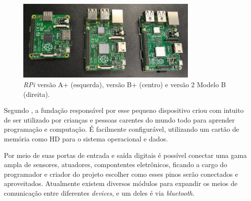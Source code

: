 \begin{figure}[htb]
	\caption{\label{fig:todos-rpi}\textit{RPi} versão A+ (esquerda), versão B+ (centro) e versão 2 Modelo B (direita).}
	\begin{center}
		\includegraphics[width=0.8\textwidth]{img/rpi-modelos.jpg}
	\end{center}
\end{figure}

\begin{table}[htb]
\end{table}

Segundo , a fundação responsável por esse pequeno dispositivo criou com intuito de ser utilizado por crianças e pessoas carentes do mundo todo para aprender programação e computação. É facilmente configurável, utilizando um cartão de memória como HD para o sistema operacional e dados.

Por meio de suas portas de entrada e saída digitais é possível conectar uma gama ampla de sensores, atuadores, compontentes eletrônicos, ficando a cargo do programador e criador do projeto escolher como esses pinos serão conectados e aproveitados. Atualmente existem diversos módulos para expandir os meios de comunicação entre diferentes \textit{devices}, e um deles é via \textit{bluetooth}.

